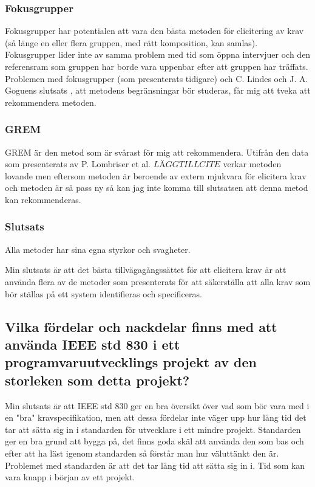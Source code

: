 \subsubsection{Fokusgrupper}
Fokusgrupper har potentialen att vara den bästa metoden för elicitering av krav (så länge en eller flera gruppen, med rätt komposition, kan samlas). Fokusgrupper lider inte av samma problem med tid som öppna intervjuer och den referensram som gruppen har borde vara uppenbar efter att gruppen har träffats. Problemen med fokusgrupper (som presenterats tidigare) och C. Lindes och J. A. Goguens slutsats \cite{goguen1993techniques}, att metodens begränsningar bör studeras, får mig att tveka att rekommendera metoden.

\subsubsection{GREM}
GREM är den metod som är svårast för mig att rekommendera. Utifrån den data som presenterats av P. Lombriser et al. $ LÄGG TILL CITE$ verkar metoden lovande men eftersom metoden är beroende av extern mjukvara för elicitera krav och metoden är så pass ny så kan jag inte komma till slutsatsen att denna metod kan rekommenderas.

\subsubsection{Slutsats}
Alla metoder har sina egna styrkor och svagheter.

Min slutsats är att det bästa tillvägagångssättet för att elicitera krav är att använda flera av de metoder som presenterats för att säkerställa att alla krav som bör ställas på ett system identifieras och specificeras.        

\subsection{Vilka fördelar och nackdelar finns med att använda IEEE std 830 i ett programvaruutvecklings projekt av den storleken som detta projekt?}
Min slutsats är att IEEE std 830 ger en bra översikt över vad som bör vara med i en "bra" kravspecifikation, men att dessa fördelar inte väger upp hur lång tid det tar att sätta sig in i standarden för utvecklare i ett mindre projekt. Standarden ger en bra grund att bygga på, det finns goda skäl att använda den som bas och efter att ha läst igenom standarden så förstår man hur väluttänkt den är. Problemet med standarden är att det tar lång tid att sätta sig in i. Tid som kan vara knapp i början av ett projekt. 

